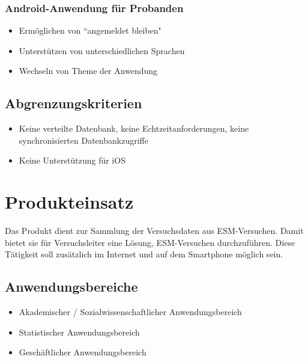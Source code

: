 \documentclass[a4paper]{scrreprt}
\begin{document}
            \subsection{Android-Anwendung f\"ur Probanden}
                \begin{itemize}
                    \item Erm\"oglichen von ``angemeldet bleiben"
                    \item Unterst\"utzen von unterschiedlichen Sprachen
                    \item Wechseln von Theme der Anwendung
                \end{itemize}
                \vspace*{0.5cm}


        \section{Abgrenzungskriterien}
            \begin{itemize}
                \item Keine verteilte Datenbank, keine Echtzeitanforderungen, keine synchronisierten Datenbankzugriffe
                \item Keine Unterst\"utzung f\"ur iOS
            \end{itemize}

    \chapter{Produkteinsatz}
        Das Produkt dient zur Sammlung der Versuchsdaten aus ESM-Versuchen. Damit bietet sie für Versuchsleiter eine Lösung, ESM-Versuchen durchzuführen. Diese Tätigkeit soll zusätzlich im Internet und auf dem Smartphone möglich sein.

        \section{Anwendungsbereiche}
            \begin{itemize}
                \item Akademischer / Sozialwissenschaftlicher Anwendungsbereich
                \item Statistischer Anwendungsbereich
                \item Geschäftlicher Anwendungsbereich
            \end{itemize}
\end{document}
